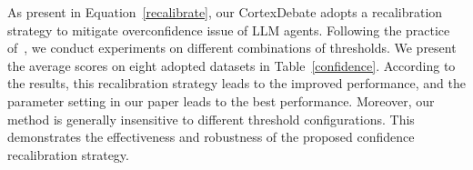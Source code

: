 As present in Equation~\eqref{recalibrate}, our CortexDebate adopts a recalibration strategy to mitigate overconfidence issue of LLM agents. Following the practice of~\cite{chen2023reconcile}, we conduct experiments on different combinations of thresholds. We present the average scores on eight adopted datasets in Table~\ref{confidence}. According to the results, this recalibration strategy leads to the improved performance, and the parameter setting in our paper leads to the best performance. Moreover, our method is generally insensitive to different threshold configurations. This demonstrates the effectiveness and robustness of the proposed confidence recalibration strategy.

